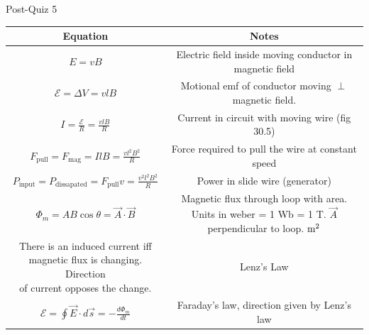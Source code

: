 \documentclass{article}
\begin{document}
\begin{center}
	\begin{section}{Post-Quiz 5}
	 \begin{tabular}{|c|c|}
		 \hline
		 Equation                                                                      & Notes                                                    \\
		 \hline

		 $E = vB$                                                                      & Electric field inside moving conductor in magnetic field \\

		 $\mathcal E = \Delta V = v l B$                                               & Motional emf of conductor moving $\perp$ magnetic field. \\

		 $I = \frac{\mathcal E}{R} = \frac{vlB}{R}$                                    & Current in circuit with moving wire (fig 30.5)           \\

		 $F_\text{pull} = F_\text{mag} = IlB = \frac{vl^2B^2}{R}$                      & Force required to pull the wire at constant speed        \\

		 $P_\text{input} = P_\text{dissapated} = F_\text{pull}v = \frac{v^2l^2B^2}{R}$ & Power in slide wire (generator)                          \\

		 $\Phi_m = AB \cos \theta = \vec A \cdot \vec B $                              & \makecell{Magnetic flux through loop with area. Units in \\
		 weber = 1 Wb = 1 T. $\vec A$ perpendicular to loop. $\text m^2$}                                                                         \\

		 \makecell{There is an induced current iff                                                                                                \\
		 magnetic flux is changing. Direction                                                                                                     \\
		 of current opposes the change.}                                               & Lenz's Law                                               \\

		 $\mathcal E = \oint \vec E \cdot d \vec s =  -\frac{d \Phi_m}{dt} $           & Faraday's law, direction given by Lenz's law             \\


\end{tabular}
\end{section}
\end{center}
\end{document}
